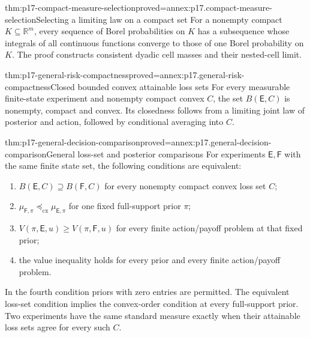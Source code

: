 \begin{hblemma}{thm:p17-compact-measure-selection}{proved=annex:p17.compact-measure-selection}{Selecting a limiting law on a compact set}
For a nonempty compact \(K\subseteq\mathbb R^m\), every sequence of
Borel probabilities on \(K\) has a subsequence whose integrals of
all continuous functions converge to those of one Borel probability
on \(K\). The proof constructs consistent dyadic cell masses and
their nested-cell limit.
\end{hblemma}

\begin{hbtheorem}{thm:p17-general-risk-compactness}{proved=annex:p17.general-risk-compactness}{Closed bounded convex attainable loss sets}
For every measurable finite-state experiment and nonempty compact
convex \(C\), the set \(B(\mathsf E,C)\) is nonempty, compact and convex.
Its closedness follows from a limiting joint law of posterior and
action, followed by conditional averaging into \(C\).
\end{hbtheorem}

\begin{hbtheorem}{thm:p17-general-decision-comparison}{proved=annex:p17.general-decision-comparison}{General loss-set and posterior comparisons}
For experiments \(\mathsf E,\mathsf F\) with the same finite state set,
the following conditions are equivalent:
\begin{enumerate}
\item \(B(\mathsf E,C)\supseteq B(\mathsf F,C)\) for every nonempty
      compact convex loss set \(C\);
\item \(\mu_{\mathsf F,\pi}\preceq_{\mathrm{cx}}\mu_{\mathsf E,\pi}\)
      for one fixed full-support prior \(\pi\);
\item \(V(\pi,\mathsf E,u)\geq V(\pi,\mathsf F,u)\) for every finite
      action/payoff problem at that fixed prior;
\item the value inequality holds for every prior and every finite
      action/payoff problem.
\end{enumerate}
In the fourth condition priors with zero entries are permitted.
The equivalent loss-set condition implies the convex-order condition
at every full-support prior.
Two experiments have the same standard measure exactly when their
attainable loss sets agree for every such \(C\).
\end{hbtheorem}

